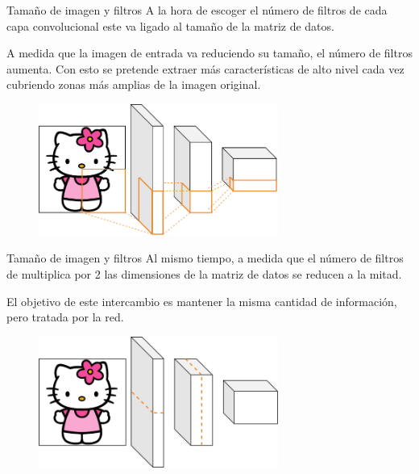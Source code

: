 \begin{frame}{Tamaño de imagen y filtros}
A la hora de escoger el \alert{número de filtros} de cada capa convolucional este va \alert{ligado} al tamaño de la \alert{matriz de datos}.

A medida que la imagen de entrada va \alert{reduciendo} su tamaño, el número de filtros \alert{aumenta}. Con esto se pretende extraer más \alert{características de alto nivel} cada vez cubriendo zonas más amplias de la imagen original.

\begin{figure}
    \centering
    \includegraphics[width=0.7\textwidth]{figures/Tema 3/DimensionFilters.png}
\end{figure}
\end{frame}

\begin{frame}{Tamaño de imagen y filtros}
Al mismo tiempo, a medida que el \alert{número} de filtros de \alert{multiplica por 2} las \alert{dimensiones} de la matriz de datos se \alert{reducen a la mitad}.

El objetivo de este \alert{intercambio} es mantener la \alert{misma cantidad} de información, pero tratada por la red.

\begin{figure}
    \centering
    \includegraphics[width=0.7\textwidth]{figures/Tema 3/ResolutionFilter_1.png}
\end{figure}
\end{frame}

